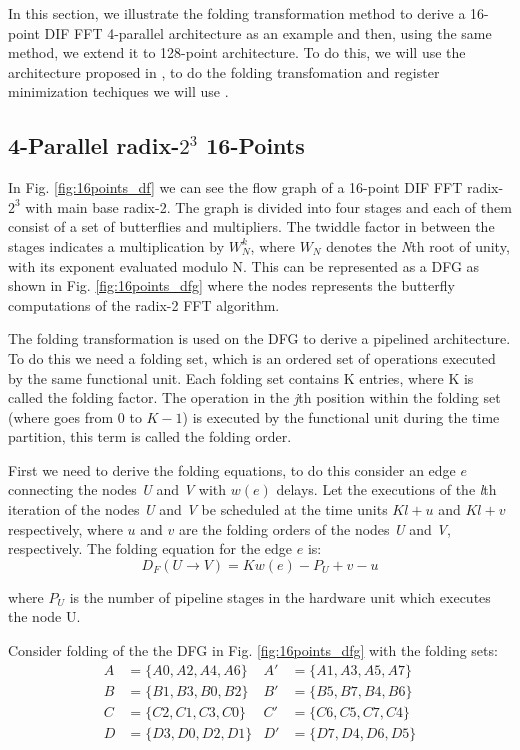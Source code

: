 \documentclass[journal,comsoc]{IEEEtran}
\begin{document}
In this section, we illustrate the folding transformation method to derive a 16-point DIF FFT 4-parallel architecture as an example and then, using the same method, we extend it to 128-point architecture. To do this, we will use the architecture proposed in \cite{ayinala_pipelined_2012}, to do the folding transfomation and register minimization techiques we will use \cite{folding_parhi_book}.



\subsection{4-Parallel radix-$2^3$ 16-Points}
In Fig. \ref{fig:16points_df} we can see the flow graph of a 16-point DIF FFT radix-$2^3$ with main base radix-2. The graph is divided into four stages and each of them consist of a set of butterflies and multipliers. The twiddle factor in between the stages indicates a multiplication by $W^k_N$, where $W_N$ denotes the \textit{N}th root of unity, with its exponent evaluated modulo N. This can be represented as a DFG as shown in Fig. \ref{fig:16points_dfg} where the nodes represents the butterfly computations of the radix-2 FFT algorithm. 

The folding transformation is used on the DFG to derive a pipelined architecture. To do this we need a folding set, which is an ordered set of operations executed by the same functional unit. Each folding set contains K entries, where K is called the folding factor. The operation in the \textit{j}th position within the folding set (where goes from $0$ to $K-1$) is executed by the functional unit during the time partition, this term is called the folding order.

First we need to derive the folding equations, to do this consider an edge $e$ connecting the nodes \textit{U} and \textit{V} with $w(e)$ delays. Let the executions of the \textit{l}th iteration of the nodes \textit{U} and \textit{V} be scheduled at the time units $Kl+u$ and $Kl+v$ respectively, where $u$ and $v$ are the folding orders of the nodes \textit{U} and \textit{V}, respectively. The folding equation for the edge $e$ is:
\begin{equation}\label{eqn:fold_equation}
D_F(U \to V) = Kw(e)-P_U+v-u
\end{equation}

where $P_U$ is the number of pipeline stages in the hardware unit which executes the node U.

Consider folding of the the DFG in Fig. \ref{fig:16points_dfg} with the folding sets:
\begin{align} 
A&= \{ A0,A2,A4,A6 \}  & A'&= \{ A1,A3,A5,A7 \} \label{eq:foldingset_16} \\
B&=\{ B1,B3,B0,B2 \}   &B'&=\{ B5,B7,B4,B6 \} 	\nonumber \\
C&=\{ C2,C1,C3,C0 \}   &C'&=\{ C6,C5,C7,C4 \} 	\nonumber \\ 
D&=\{ D3,D0,D2,D1 \}   &D'&=\{ D7,D4,D6,D5 \}  \nonumber
\end{align}
\end{document}
